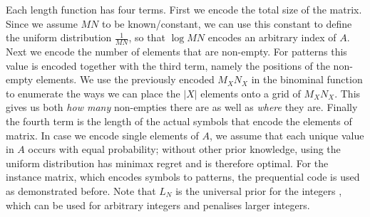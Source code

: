 \documentclass{llncs}
\begin{document}
Each length function has four terms. First we encode the total size of the matrix. Since we assume $MN$ to be known/constant, we can use this constant to define the uniform distribution $\frac{1}{MN}$, so that $\log{MN}$ encodes an arbitrary index of $A$. Next we encode the number of elements that are non-empty. For patterns this value is encoded together with the third term, namely the positions of the non-empty elements. We use the previously encoded $M_XN_X$ in the binominal function to enumerate the ways we can place the $|X|$ elements onto a grid of $M_XN_X$. This gives us both \emph{how many} non-empties there are as well as \emph{where} they are. Finally the fourth term is the length of the actual symbols that encode the elements of matrix. In case we encode single elements of $A$, we assume that each unique value in $A$ occurs with equal probability; without other prior knowledge, using the uniform distribution has minimax regret and is therefore optimal. For the instance matrix, which encodes symbols to patterns, the prequential code is used as demonstrated before. Note that $L_N$ is the universal prior for the integers \cite{univinteger}, which can be used for arbitrary integers and penalises larger integers.


\end{document}
